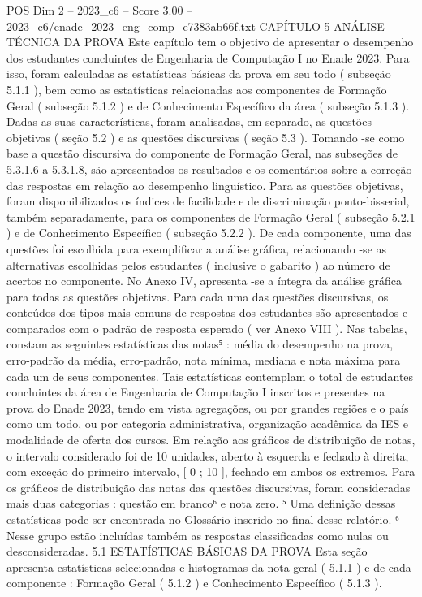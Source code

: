 \begin{textsample}{POS Dim 2 – 2023\_c6 – Score 3.00 – 2023\_c6/enade\_2023\_eng\_comp\_e7383ab66f.txt}  \label{ex:f2_pos_163}
CAPÍTULO 5 ANÁLISE TÉCNICA DA PROVA Este capítulo tem o objetivo de apresentar o desempenho dos estudantes concluintes de Engenharia de Computação I no Enade 2023.
Para isso, foram calculadas as estatísticas básicas da prova em seu todo ( subseção 5.1.1 ), bem como as estatísticas relacionadas aos componentes de Formação Geral ( subseção 5.1.2 ) e de Conhecimento Específico da área ( subseção 5.1.3 ).
Dadas as suas características, foram analisadas, em separado, as questões objetivas ( seção 5.2 ) e as questões discursivas ( seção 5.3 ).
Tomando -se como base a questão discursiva do componente de Formação Geral, nas subseções de 5.3.1.6 a 5.3.1.8, são apresentados os resultados e os comentários sobre a correção das respostas em relação ao desempenho linguístico.
Para as questões objetivas, foram disponibilizados os índices de facilidade e de discriminação ponto-bisserial, também separadamente, para os componentes de Formação Geral ( subseção 5.2.1 ) e de Conhecimento Específico ( subseção 5.2.2 ).
De cada componente, uma das questões foi escolhida para exemplificar a análise gráfica, relacionando -se as alternativas escolhidas pelos estudantes ( inclusive o gabarito ) ao número de acertos no componente.
No Anexo IV, apresenta -se a íntegra da análise gráfica para todas as questões objetivas.
Para cada uma das questões discursivas, os conteúdos dos tipos mais comuns de respostas dos estudantes são apresentados e comparados com o padrão de resposta esperado ( ver Anexo VIII ).
Nas tabelas, constam as seguintes estatísticas das notas⁵ : média do desempenho na prova, erro-padrão da média, erro-padrão, nota mínima, mediana e nota máxima para cada um de seus componentes.
Tais estatísticas contemplam o total de estudantes concluintes da área de Engenharia de Computação I inscritos e presentes na prova do Enade 2023, tendo em vista agregações, ou por grandes regiões e o país como um todo, ou por categoria administrativa, organização acadêmica da IES e modalidade de oferta dos cursos.
Em relação aos gráficos de distribuição de notas, o intervalo considerado foi de 10 unidades, aberto à esquerda e fechado à direita, com exceção do primeiro intervalo, [ 0 ; 10 ], fechado em ambos os extremos.
Para os gráficos de distribuição das notas das questões discursivas, foram consideradas mais duas categorias : questão em branco⁶ e nota zero. ⁵ Uma definição dessas estatísticas pode ser encontrada no Glossário inserido no final desse relatório. ⁶ Nesse grupo estão incluídas também as respostas classificadas como nulas ou desconsideradas. 5.1 ESTATÍSTICAS BÁSICAS DA PROVA Esta seção apresenta estatísticas selecionadas e histogramas da nota geral ( 5.1.1 ) e de cada componente : Formação Geral ( 5.1.2 ) e Conhecimento Específico ( 5.1.3 ).

\end{textsample}

